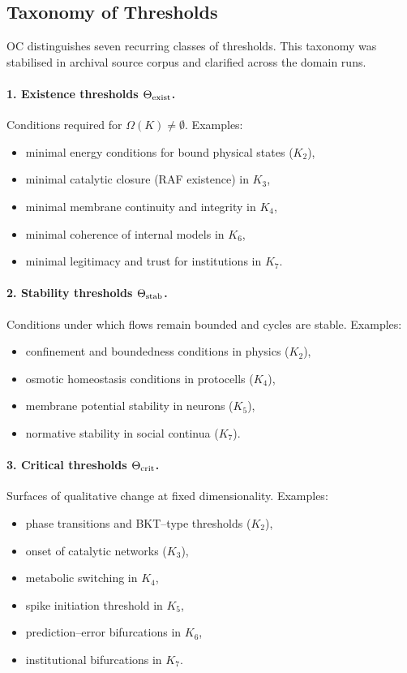 \subsection{Taxonomy of Thresholds}

OC distinguishes seven recurring classes of thresholds. This taxonomy was
stabilised in archival source corpus and clarified across the domain runs.

\paragraph{1. Existence thresholds \(\Theta_{\rm exist}\).}
Conditions required for \(\Omega(K)\neq\emptyset\).
Examples:
\begin{itemize}
    \item minimal energy conditions for bound physical states (\(K_2\)),
    \item minimal catalytic closure (RAF existence) in \(K_3\),
    \item minimal membrane continuity and integrity in \(K_4\),
    \item minimal coherence of internal models in \(K_6\),
    \item minimal legitimacy and trust for institutions in \(K_7\).
\end{itemize}

\paragraph{2. Stability thresholds \(\Theta_{\rm stab}\).}
Conditions under which flows remain bounded and cycles are stable.
Examples:
\begin{itemize}
    \item confinement and boundedness conditions in physics (\(K_2\)),
    \item osmotic homeostasis conditions in protocells (\(K_4\)),
    \item membrane potential stability in neurons (\(K_5\)),
    \item normative stability in social continua (\(K_7\)).
\end{itemize}

\paragraph{3. Critical thresholds \(\Theta_{\rm crit}\).}
Surfaces of qualitative change at fixed dimensionality.
Examples:
\begin{itemize}
    \item phase transitions and BKT–type thresholds (\(K_2\)),
    \item onset of catalytic networks (\(K_3\)),
    \item metabolic switching in \(K_4\),
    \item spike initiation threshold in \(K_5\),
    \item prediction–error bifurcations in \(K_6\),
    \item institutional bifurcations in \(K_7\).
\end{itemize}


